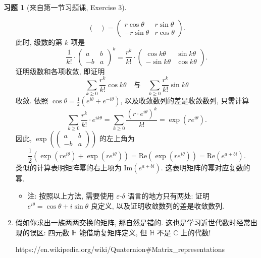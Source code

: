 \documentclass[11pt]{ctexart}
\theoremstyle{definition}
\numberwithin{equation}{section}
\theoremstyle{definition}
\newtheorem*{exercise}{习题}
\theoremstyle{remark}
\begin{document}
\begin{exercise}[来自第一节习题课, Exercise 3]
\begin{aaa}
\begin{enumerate}
\begin{equation}
\begin{pmatrix}
            \end{pmatrix} =\begin{pmatrix}
            r\cos \theta  & r\sin \theta \\
            -r\sin \theta  & r\cos \theta 
            \end{pmatrix}.
       \end{equation} 
       此时, 级数的第 $k$ 项是 
       \begin{equation}
        \frac{1}{k!} \cdot \begin{pmatrix}
            a & b\\
            -b & a
            \end{pmatrix}^{k} =\frac{r^{k}}{k!} \cdot \begin{pmatrix}
            \cos k\theta  & \sin k\theta \\
            -\sin k\theta  & \cos k\theta 
            \end{pmatrix}.
       \end{equation}
       证明级数和各项收敛, 即证明
       \begin{equation}
        \sum_{k\geq 0}\frac{r^k}{k!}\cos k\theta\quad \text{与}\quad \sum_{k\geq 0}\frac{r^k}{k!}\sin k\theta
       \end{equation}
       收敛. 依照 $\cos \theta = \frac12(e^{i\theta}+e^{-i\theta})$, 以及收敛数列的差是收敛数列, 只需计算
       \begin{equation}
        \sum_{k\geq 0}\frac{r^k}{k!}\cdot e^{ik\theta}=\sum_{k\geq 0}\frac{(r\cdot e^{i\theta})^k}{k!}=\exp ({re^{i\theta}}). 
       \end{equation}
       因此, $\exp\left(\begin{pmatrix}
        a&b\\-b&a
       \end{pmatrix}\right)$ 的左上角为 
       \begin{equation}
        \frac{1}{2}(\exp ({re^{i\theta}})+\exp ({re^{i\theta}}))=\mathrm{Re}(\exp(re^{i\theta}))=\mathrm{Re}(e^{a+bi}). 
       \end{equation}
       类似的计算表明矩阵幂的右上项为 $\mathrm{Im}(e^{a+bi})$. 这表明矩阵的幂对应复数的幂. 
       \begin{itemize}
        \item 注: 按照以上方法, 需要使用 $\varepsilon$-$\delta$ 语言的地方只有两处: 证明 $e^{i\theta}=\cos \theta + i\sin \theta$ 良定义, 以及证明收敛数列的差是收敛数列. 
       \end{itemize}
       \item 假如你求出一族两两交换的矩阵, 那自然是错的. 这也是学习近世代数时经常出现的误区: 四元数 $\mathbb H$ 能借助复矩阵定义, 但 $\mathbb H$ 不是 $\mathbb C$ 上的代数! 
       \begin{llll}
        https://en.wikipedia.org/wiki/Quaternion\#Matrix\_representations
       \end{llll}
    \end{enumerate}
\end{aaa}
\end{exercise}
\end{document}
